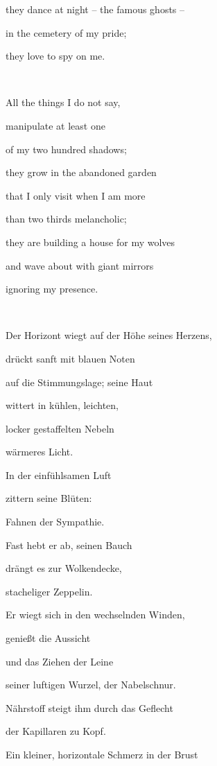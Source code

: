 \documentclass[a4paper]{article}
\begin{document}
they dance at night – the famous ghosts – 

in the cemetery of my pride;

they love to spy on me.

~

All the things I do not say,

manipulate at least one

of my two hundred shadows;

they grow in the abandoned garden

that I only visit when I am more

than two thirds melancholic;

they are building a house for my wolves 

and wave about with giant mirrors

ignoring my presence.

~



\bigskip


\bigskip

Der Horizont wiegt auf der Höhe seines Herzens,

drückt sanft mit blauen Noten 

auf die Stimmungslage; seine Haut 

wittert in kühlen, leichten,

locker gestaffelten Nebeln

wärmeres Licht. 


\bigskip

In der einfühlsamen Luft \ \ 

zittern seine Blüten: 

Fahnen der Sympathie.

Fast hebt er ab, seinen Bauch

drängt es zur Wolkendecke,

stacheliger Zeppelin.


\bigskip

Er wiegt sich in den wechselnden Winden, 

genießt die Aussicht

und das Ziehen der Leine 

seiner luftigen Wurzel, der Nabelschnur.

Nährstoff steigt ihm durch das Geflecht 

der Kapillaren zu Kopf.


\bigskip

Ein kleiner, horizontale Schmerz in der Brust
\end{document}
